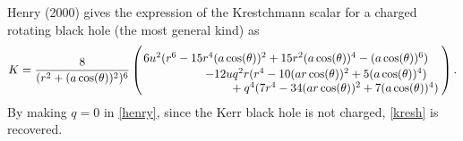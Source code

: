\documentclass[11pt,a4paper]{article}
\begin{document}
Henry (2000) gives the expression of the Krestchmann scalar for a charged rotating black hole (the most general kind) as
\begin{equation}\label{henry}
	K = \frac{8}{(r^2+(a\cos(\theta))^2)^6} \left(\splitdfrac{6u^2(r^6 - 15r^4(a\cos(\theta))^2 + 15r^2(a\cos(\theta))^4 - (a\cos(\theta))^6)}{\splitfrac{- 12uq^2r(r^4 - 10(ar\cos(\theta))^2 + 5(a\cos(\theta))^4)}{ + q^4(7r^4 - 34(ar\cos(\theta))^2 + 7(a\cos(\theta))^4)}}\right).
\end{equation}
By making $q= 0$ in \ref{henry}, since the Kerr black hole is not charged, \ref{kresh} is recovered. 
\end{document}
